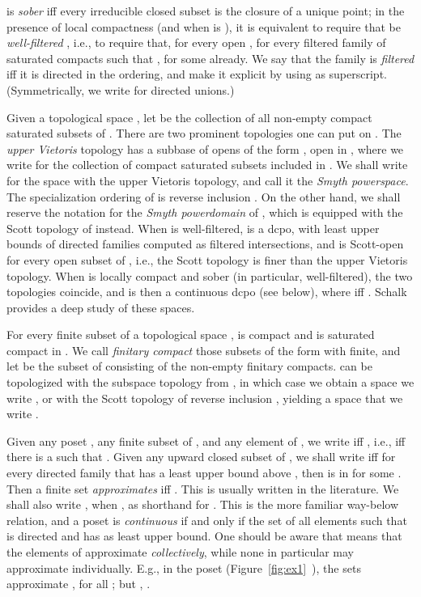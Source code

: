 \documentclass{LMCS}
\begin{document}
 is {\em sober\/} iff every irreducible closed subset is the
closure of a unique point; in the presence of local compactness (and
when  is ),
it is equivalent to require that  be {\em well-filtered\/}
\cite[Theorem~II-1.21]{GHKLMS:contlatt}, i.e., to require that, for
every open , for every filtered family  of
saturated compacts such that ,  for some  already.  We say
that the family is {\em filtered\/} iff it is directed in the
 ordering, and make it explicit by using
 as superscript.  (Symmetrically, we write  for
directed unions.)

Given a topological space , let  be the collection of
all non-empty compact saturated subsets  of .  There are two
prominent topologies one can put on .  The {\em upper
  Vietoris\/} topology has a subbase of opens of the form ,
 open in , where we write  for the collection of compact
saturated subsets  included in .  We shall write  for
the space  with the upper Vietoris topology, and call it
the \emph{Smyth powerspace}.  The specialization ordering of 
is reverse inclusion .  On the other hand, we shall reserve
the notation  for the {\em Smyth powerdomain\/} of
, which is equipped with the Scott topology of  instead.
When  is well-filtered,  is a dcpo, with least upper
bounds of directed families computed as filtered intersections, and
 is Scott-open for every open subset  of , i.e., the
Scott topology is finer than the upper Vietoris topology.  When  is
locally compact and sober (in particular, well-filtered), the two
topologies coincide, and  is then a continuous dcpo
(see below), where  iff 
\cite[Proposition~I-1.24.2]{GHKLMS:contlatt}.  Schalk
\cite[Chapter~7]{Schalk:PhD} provides a deep study of these spaces.

For every finite subset  of a topological space ,  is compact
and  is saturated compact in .  We call {\em finitary
  compact\/} those subsets of the form  with  finite, and
let  be the subset of  consisting of the
non-empty finitary compacts.   can be topologized with the
subspace topology from , in which case we obtain a space we
write , or with the Scott topology of reverse inclusion
, yielding a space that we write .

Given any poset , any finite subset  of , and any element 
of , we write  iff , i.e., iff there is a
 such that .  Given any upward closed subset  of
, we shall write  iff for every directed family
 that has a least upper bound above , then 
is in  for some .  Then a finite set  {\em
  approximates\/}  iff .  This is usually written  in the literature.
We shall also write , when , as shorthand for .  This is the more familiar way-below relation, and a poset
is {\em continuous\/} if and only if the set  of all
elements  such that  is directed and has  as least
upper bound.  One should be aware that  means that the
elements of  approximate  {\em collectively\/}, while none in
particular may approximate  individually.  E.g., in the poset
 (Figure~\ref{fig:ex1}~), the sets  approximate , for all ; but , .
\end{document}
